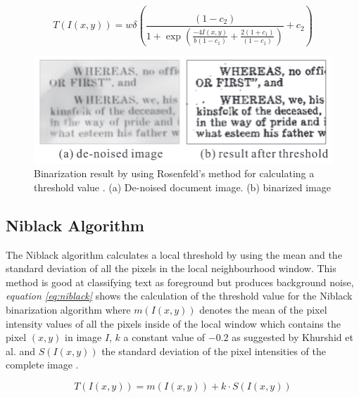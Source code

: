 \documentclass[11pt]{article}
\begin{document}
				\begin{Large}
				\begin{equation} \label{eq:rosenfeld}
				T(I(x,y)) = w \delta (\frac{(1 - c_2)}{1 + \exp(\frac{-4I(x, y)}{b(1 - c_1)} + \frac{2(1 + c_1)}{(1 - c_1)})} + c_2)
				\end{equation}
				\end{Large}

				\begin{figure}[!htb]
				 \centering
				 \includegraphics[scale=1]{rosenfeld.png}
				 \caption{Binarization result by using Rosenfeld's method for calculating a threshold value \cite{chen2017broken}. (a) De-noised document image. (b) binarized image} %
				 \label{fig:rosenfeld} %
				\end{figure}

  		\subsection{Niblack Algorithm}%
  			The Niblack algorithm calculates a local threshold by using the mean and the standard deviation of all the pixels in the local neighbourhood window. This method is good at classifying text as foreground but produces background noise, \textit{equation \ref{eq:niblack}} shows the calculation of the threshold value for the Niblack binarization algorithm where $m(I(x, y))$ denotes the mean of the pixel intensity values of all the pixels inside of the local window which contains the pixel $(x, y)$ in image $I$, $k$ a constant value of $-0.2$ as suggested by Khurshid et al. \cite{khurshid2009comparison} and $S(I(x, y))$ the standard deviation of the pixel intensities of the complete image \cite{khurshid2009comparison}.

				\begin{large}
				\begin{equation} \label{eq:niblack}
					T(I(x, y)) = m(I(x, y)) + k \cdot S(I(x, y))
				\end{equation}
				\end{large}
\end{document}
